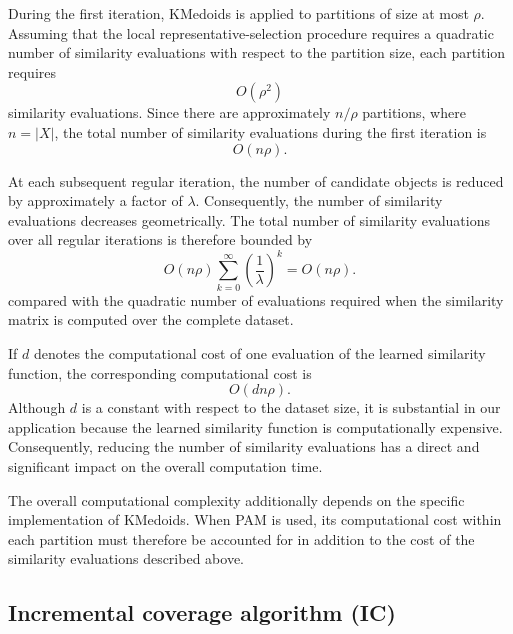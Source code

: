 \documentclass{ieeeaccess}
\newcommand{\toblack}{\color{black}}
\newcommand{\tored}{\color{red}}
\newcommand{\toblue}{\color{blue}}
\newcommand{\pk}[1]{{\tored [{\bfseries Pierre}: {\itshape #1}] \toblack}}
\newcommand{\ga}[1]{{\toblue [{\bfseries Gillian}: {\itshape #1}] \toblack}}
\newcommand{\maxpartitionsize}{\rho}
\newcommand{\reductionfactor}{\lambda}
\newcommand{\kmedoidsalg}{KMedoids\xspace}
\newcommand{\inclusion}{IC\xspace}
\begin{document}
During the first iteration, \kmedoidsalg is applied to partitions of size at most $\maxpartitionsize$. Assuming that the local representative-selection procedure requires a quadratic number of similarity evaluations with respect to the partition size, each partition requires
\[
O(\maxpartitionsize^2)
\]
similarity evaluations. Since there are approximately $n/\maxpartitionsize$ partitions, where $n=|X|$, the total number of similarity evaluations during the first iteration is
\[
O(n\maxpartitionsize).
\]

At each subsequent regular iteration, the number of candidate objects is reduced by approximately a factor of $\reductionfactor$. Consequently, the number of similarity evaluations decreases geometrically. The total number of similarity evaluations over all regular iterations is therefore bounded by
\[
O(n\maxpartitionsize)
\sum_{k=0}^{\infty}
\left(\frac{1}{\reductionfactor}\right)^k
=
O(n\maxpartitionsize).
\]
compared with the quadratic number of evaluations required when the
similarity matrix is computed over the complete dataset.

If $d$ denotes the computational cost of one evaluation of the learned similarity function, the corresponding computational cost is
\[
O(dn\maxpartitionsize).
\]
Although $d$ is a constant with respect to the dataset size, it is substantial in our application because the learned similarity function is computationally expensive. Consequently, reducing the number of similarity evaluations has a direct and significant impact on the overall computation time.


The overall computational complexity additionally depends on the specific implementation of \kmedoidsalg. When PAM is used, its computational cost within each partition must therefore be accounted for in addition to the cost of the similarity evaluations described above.


\subsection{Incremental coverage algorithm (\inclusion)}
\label{sec:inclusion}
\end{document}
